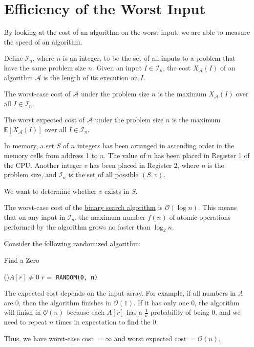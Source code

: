 \section{Efficiency of the Worst Input}
By looking at the cost of an algorithm on the worst input, we are able to measure the speed of an algorithm.

\begin{definition}
  Define \(\mathcal{I}_n\), where \(n\) is an integer, to be the set of all inputs to a problem that have the same problem size \(n\). Given an input \(I \in \mathcal{I}_n\), the cost \(X_{\mathcal{A}}(I)\) of an algorithm \(\mathcal{A}\) is the length of its execution on \(I\). 

  The worst-case cost of \(\mathcal{A}\) under the problem size \(n\) is the maximum \(X_{\mathcal{A}}(I)\) over all \(I \in \mathcal{I}_n\). 

  The worst expected cost of \(\mathcal{A}\) under the problem size \(n\) is the maximum \(\mathbb{E}[X_{\mathcal{A}}(I)]\) over all \(I \in \mathcal{I}_n\). 
\end{definition}

\begin{eg}
  In memory, a set \(S\) of \(n\) integers has been arranged in ascending order in the memory cells from address 1 to \(n\). The value of \(n\) has been placed in Register 1 of the CPU. Another integer \(v\) has been placed in Register 2, where \(n\) is the problem size, and \(\mathcal{I}_n\) is the set of all possible \((S, v)\). 

  We want to determine whether \(v\) exists in \(S\). 

  The worst-case cost of the \href{https://www.ryanc.wtf/files/CSCI2100.pdf#page=16}{binary search algorithm} is \(\mathcal{O}(\log n)\). This means that on any input in \(\mathcal{I}_n\), the maximum number \(f(n)\) of atomic operations performed by the algorithm grows no faster than \(\log_2 n\). 
\end{eg}

\begin{eg}
  Consider the following randomized algorithm: 
  
  \begin{algorithm}[H]
	\DontPrintSemicolon{}
	\caption{Find a Zero}
	\BlankLine
	\While(){\(A[r] \neq 0\)}{
		\(r = \) \texttt{RANDOM(0, n)}
	}
	\;
  \end{algorithm}

  The expected cost depends on the input array. For example, if all numbers in \(A\) are 0, then the algorithm finishes in \(\mathcal{O}(1)\). If it has only one 0, the algorithm will finish in \(\mathcal{O}(n)\) because each \(A[r]\) has a \(\frac{1}{n}\) probability of being 0, and we need to repeat \(n\) times in expectation to find the 0. 
  
  Thus, we have worst-case cost \(= \infty\) and worst expected cost \(= \mathcal{O}(n)\). 
\end{eg}

